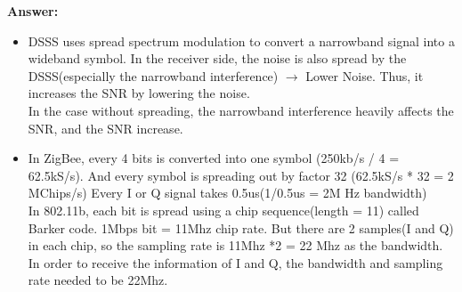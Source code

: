 \documentclass[12pt]{article}
\begin{document}
\textbf{Answer:} 
\begin{itemize}
    \item DSSS uses spread spectrum modulation to convert a narrowband signal into a wideband symbol. In the receiver side, the noise is also spread by the DSSS(especially the narrowband interference) $\xrightarrow{}$ Lower Noise. Thus, it increases the SNR by lowering the noise.\\
    In the case without spreading, the narrowband interference heavily affects the SNR, and the SNR increase.
    \item In ZigBee, every 4 bits is converted into one symbol (250kb/s / 4 = 62.5kS/s). And every symbol is spreading out by factor 32 (62.5kS/s * 32 = 2 MChips/s) Every I or Q signal takes 0.5us(1/0.5us = 2M Hz bandwidth)\\
    In 802.11b, each bit is spread using a chip sequence(length = 11) called Barker code. 1Mbps bit = 11Mhz chip rate. But there are 2 samples(I and Q) in each chip, so the sampling rate is 11Mhz *2 = 22 Mhz as the bandwidth. In order to receive the information of I and Q, the bandwidth and sampling rate needed to be 22Mhz.\\
\end{itemize}

\end{document}
